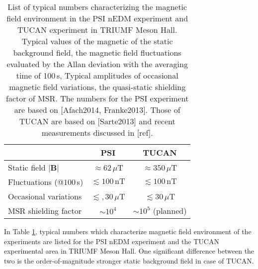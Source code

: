 

\begin{table}[htb]
\centering 
\begin{tabular}{|l||c|c|}
\hline

 & \multicolumn{1}{c|}{\textbf{PSI}} & \multicolumn{1}{c|}{\textbf{TUCAN}} \\ \hline
Static field $| \bm{B}|$ & $\approx62\,\mu$T     & $\approx 350\,\mu$T                       \\ \hline
Fluctuations (@$100\,$s) & $\lesssim 100\,\mathrm{nT}$ & $\lesssim 100\,\mathrm{nT}$ \\ \hline
Occasional variations    & $\lesssim,30\,\mu$T         & $\lesssim 30\,\mu$T            \\ \hline
 MSR shielding  factor       &    $\sim 10^4$   &   $\sim 10^5$ (planned)  \\ \hline 

\end{tabular}
\caption{List of typical numbers characterizing the magnetic field environment in the PSI nEDM experiment and TUCAN experiment in TRIUMF Meson Hall. Typical values of the magnetic of the static background field, the magnetic field fluctuations evaluated by the Allan deviation with the averaging time of 100\,s, Typical amplitudes of occasional magnetic field variations, the quasi-static shielding factor of MSR. The numbers for the PSI experiment are based on [Afach2014, Franke2013]. Those of TUCAN are based on [Sarte2013] and recent measurements discussed in [ref]. 
}
\label{tab:amc_comparaion}
\end{table}

In Table \ref{tab:amc_comparaion}, typical numbers which characterize magnetic field environment of the experiments are listed for the PSI nEDM experiment and the TUCAN experimental area in TRIUMF Meson Hall. 
One significant difference between the two is the order-of-magnitude stronger static background field in case of TUCAN.    



